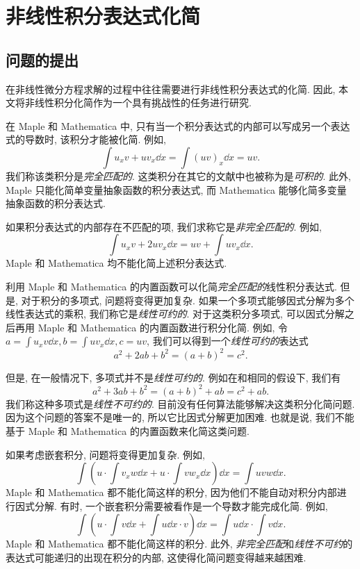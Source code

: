 \chapter{非线性积分表达式化简}\label{ch06}
\section{问题的提出}
在非线性微分方程求解的过程中往往需要进行非线性积分表达式的化简. 因此, 本文将非线性积分化简作为一个具有挑战性的任务进行研究.

在 Maple 和 Mathematica 中, 只有当一个积分表达式的内部可以写成另一个表达式的导数时, 该积分才能被化简. 例如, 
\begin{equation}
\int\!{u_xv+uv_x \dd x}=\int\!{(uv)_x\dd x}=uv.
\label{complete_matched}
\end{equation}
我们称该类积分是\emph{完全匹配的}. 这类积分在其它的文献中也被称为是\emph{可积的}. 此外, Maple 只能化简单变量抽象函数的积分表达式, 而 Mathematica 能够化简多变量抽象函数的积分表达式. 

如果积分表达式的内部存在不匹配的项, 我们求称它是\emph{非完全匹配的}. 例如,
\begin{equation}
\int\!{u_xv+2uv_x \dd x}=uv+\int\!{uv_x\dd x}.
\label{incomplete_matched}
\end{equation}
Maple 和 Mathematica 均不能化简上述积分表达式. 

利用 Maple 和 Mathematica 的内置函数可以化简\emph{完全匹配的}线性积分表达式. 但是, 对于积分的多项式, 问题将变得更加复杂. 如果一个多项式能够因式分解为多个线性表达式的乘积, 我们称它是\emph{线性可约的}. 对于这类积分多项式, 可以因式分解之后再用 Maple 和 Mathematica 的内置函数进行积分化简. 例如, 令$a=\int{u_x v \dd x},b=\int{u v_x \dd x},c=uv$, 我们可以得到一个\emph{线性可约的}表达式
\begin{equation}
a^2+2ab+b^2=(a+b)^2=c^2.
\label{liner_reducible}
\end{equation}

但是, 在一般情况下, 多项式并不是\emph{线性可约的}. 例如在和相同的假设下, 我们有
\begin{equation}
a^2+3ab+b^2=(a+b)^2+ab=c^2+ab.
\label{non_linear_reducible}
\end{equation} 
我们称这种多项式是\emph{线性不可约的}. 目前没有任何算法能够解决这类积分化简问题. 因为这个问题的答案不是唯一的, 所以它比因式分解更加困难. 也就是说, 我们不能基于 Maple 和 Mathematica 的内置函数来化简这类问题. 

如果考虑嵌套积分, 问题将变得更加复杂. 例如, 
\begin{equation}
\int\!{\left(u\cdot\int\!{v_xw\dd x}+u\cdot\int\!{vw_x\dd x}\right)\dd x}=\int\!{uvw\dd x}.
\label{nested_integral}
\end{equation}
Maple 和 Mathematica 都不能化简这样的积分, 因为他们不能自动对积分内部进行因式分解. 有时, 一个嵌套积分需要被看作是一个导数才能完成化简. 例如,
\begin{equation}
\int\!{\left(u\cdot\int\!{v\dd x}+\int\!{u\dd x}\cdot v\right)\dd x}=\int\!{u\dd x}\cdot\int\!{v\dd x}.
\label{integral_as_differential}
\end{equation}
Maple 和 Mathematica 都不能化简这样的积分. 此外, \emph{非完全匹配}和\emph{线性不可约}的表达式可能递归的出现在积分的内部, 这使得化简问题变得越来越困难.


